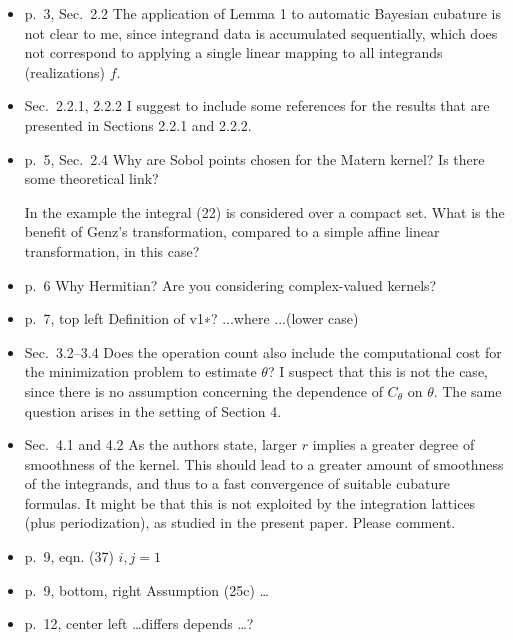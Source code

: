\documentclass{amsart}
\begin{document}
\begin{itemize}
\item p.\ 3, Sec.\ 2.2 The application of Lemma 1 to automatic Bayesian cubature is not clear to me, since integrand data is accumulated sequentially, which does not correspond to applying a single linear mapping to all integrands (realizations) $f$.

\item Sec.\ 2.2.1, 2.2.2 I suggest to include some references for the results that are presented in Sections 2.2.1 and 2.2.2.

\item p.\ 5, Sec.\ 2.4 Why are Sobol points chosen for the Matern kernel? Is there some theoretical link?

In the example the integral (22) is considered over a compact set. What is the benefit of Genz’s transformation, compared to a simple affine linear transformation, in this case?

\item p.\ 6 Why Hermitian? Are you considering complex-valued kernels? 

\item p.\ 7, top left Definition of v1∗?
...where ...(lower case)

\item Sec.\ 3.2--3.4 Does the operation count also include the computational cost for the minimization problem to estimate $\theta$? I suspect that this is not the case, since there is no assumption concerning the dependence of $C_\theta$ on $\theta$. The same question arises in the setting of Section 4.

\item Sec.\ 4.1 and 4.2 As the authors state, larger $r$ implies a greater degree of smoothness of the kernel. This should lead to a greater amount of smoothness of the integrands, and thus to a fast convergence of suitable cubature formulas. It might be that this is not exploited by the integration lattices (plus periodization), as studied in the present paper. Please comment.

\item p.\ 9, eqn. (37) $i, j = 1$

\item p.\ 9, bottom, right Assumption (25c) \ldots 

\item p.\ 12, center left  \ldots differs depends \ldots ?


\end{itemize}
\end{document}
